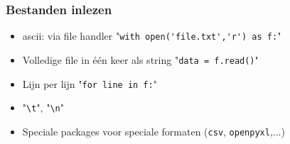 \documentclass[t]{beamer}
\begin{document}
\begin{frame}[fragile]
	\frametitle{Bestanden inlezen}
	\begin{itemize}
		\item ascii: via file handler "\lstinline{with open('file.txt','r') as f:}"
		\item Volledige file in één keer als string "\lstinline{data = f.read()}"
		\item Lijn per lijn "\lstinline{for line in f:}"
		\item "\lstinline{\t}", "\lstinline{\n}"
		\item Speciale packages voor speciale formaten (\lstinline{csv}, \lstinline{openpyxl},...)
	\end{itemize}
	
	
	
\end{frame}  	
\end{document}
